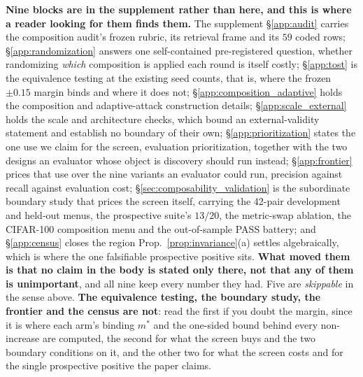 \documentclass{article}
\begin{document}
\noindent \textbf{Nine blocks are in the supplement rather than here, and this is where a reader looking for them finds them.} The supplement §\ref{app:audit} carries the composition audit's frozen rubric, its retrieval frame and its $59$ coded rows; §\ref{app:randomization} answers one self-contained pre-registered question, whether randomizing \emph{which} composition is applied each round is itself costly; §\ref{app:tost} is the equivalence testing at the existing seed counts, that is, where the frozen $\pm0.15$ margin binds and where it does not; §\ref{app:composition_adaptive} holds the composition and adaptive-attack construction details; §\ref{app:scale_external} holds the scale and architecture checks, which bound an external-validity statement and establish no boundary of their own; §\ref{app:prioritization} states the one use we claim for the screen, evaluation prioritization, together with the two designs an evaluator whose object is discovery should run instead; §\ref{app:frontier} prices that use over the nine variants an evaluator could run, precision against recall against evaluation cost; §\ref{sec:composability_validation} is the subordinate boundary study that prices the screen itself, carrying the 42-pair development and held-out menus, the prospective suite's $13/20$, the metric-swap ablation, the CIFAR-100 composition menu and the out-of-sample PASS battery; and §\ref{app:census} closes the region Prop.~\ref{prop:invariance}(a) settles algebraically, which is where the one falsifiable prospective positive sits. \textbf{What moved them is that no claim in the body is stated only there, not that any of them is unimportant}, and all nine keep every number they had. Five are \emph{skippable} in the sense above. \textbf{The equivalence testing, the boundary study, the frontier and the census are not}: read the first if you doubt the margin, since it is where each arm's binding $m^\ast$ and the one-sided bound behind every non-increase are computed, the second for what the screen buys and the two boundary conditions on it, and the other two for what the screen costs and for the single prospective positive the paper claims.
\end{document}
